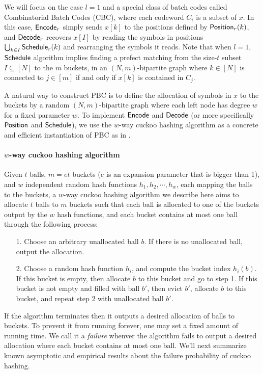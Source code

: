 We will focus on the case $l=1$ and a special class of batch codes called Combinatorial Batch Codes (CBC)\cite{cryptoeprint:2017/1142,10.1145/1007352.1007396,cryptoeprint:2008/306}, where each codeword $C_i$ is a subset of $x$. In this case, ${\sf Encode}_r$ simply sends $x[k]$ to the positions defined by ${\sf Position}_r(k)$, and ${\sf Decode}_r$ recovers $x[I]$ by reading the symbols in positions $\bigcup_{k\in I}{\sf Schedule}_r(k)$ and rearranging the symbols it reads. Note that when $l=1$, ${\sf Schedule}$ algorithm implies finding a prefect matching from the size-$t$ subset $I\subseteq[N]$ to the $m$ buckets, in an $(N,m)$-bipartite graph where $k\in[N]$ is connected to $j\in[m]$ if and only if $x[k]$ is contained in $C_j$. 

A natural way to construct PBC is to define the allocation of symbols in $x$ to the buckets by a random $(N,m)$-bipartite graph where each left node has degree $w$ for a fixed parameter $w$. To implement ${\sf Encode}$ and ${\sf Decode}$ (or more specifically ${\sf Position}$ and ${\sf Schedule}$), we use the $w$-way cuckoo hashing algorithm\cite{10.1007/3-540-44676-1_10} as a concrete and efficient instantiation of PBC as in \cite{cryptoeprint:2017/1142,cryptoeprint:2018/579,cryptoeprint:2022/1455}. 

\paragraph{$w$-way cuckoo hashing algorithm}Given $t$ balls, $m=et$ buckets ($e$ is an expansion parameter that is bigger than 1), and $w$ independent random hash functions $h_1, h_2,\cdots, h_w$, each mapping the balls to the buckets, a $w$-way cuckoo hashing algorithm we describe here aims to allocate $t$ balls to $m$ buckets such that each ball is allocated to one of the buckets output by the $w$ hash functions, and each bucket contains at most one ball through the following process: 
\begin{itemize}
  \item[1.] Choose an arbitrary unallocated ball $b$. If there is no unallocated ball, output the allocation. 
  \item[2.] Choose a random hash function $h_i$, and  compute the bucket index $h_i(b)$. If this bucket is empty, then allocate $b$ to this bucket and go to step 1. If this bucket is not empty and filled with ball $b'$, then evict $b'$, allocate $b$ to this bucket,  and repeat step 2 with unallocated ball $b'$. 
\end{itemize}
If the algorithm terminates then it outputs a desired allocation of balls to buckets. To prevent it from running forever, one may set a fixed amount of running time. We call it a \emph{failure} whenver the algorithm fails to output a desired allocation where each bucket contains at most one ball. We'll next summarize known asymptotic and empirical results about the failure probability of cuckoo hashing. 

